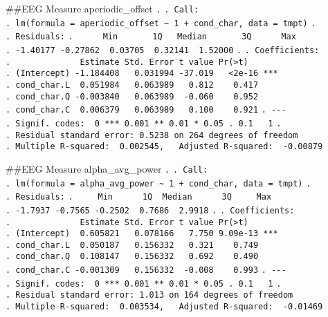 \documentclass[
]{article}
\begin{document}
\#\#EEG Measure aperiodic\_offset \texttt{.} \texttt{.\ Call:}
\texttt{.\ lm(formula\ =\ aperiodic\_offset\ \textasciitilde{}\ 1\ +\ cond\_char,\ data\ =\ tmpt)}
\texttt{.} \texttt{.\ Residuals:}
\texttt{.\ \ \ \ \ \ Min\ \ \ \ \ \ \ 1Q\ \ \ Median\ \ \ \ \ \ \ 3Q\ \ \ \ \ \ Max}
\texttt{.\ -1.40177\ -0.27862\ \ 0.03705\ \ 0.32141\ \ 1.52000}
\texttt{.} \texttt{.\ Coefficients:}
\texttt{.\ \ \ \ \ \ \ \ \ \ \ \ \ \ Estimate\ Std.\ Error\ t\ value\ Pr(\textgreater{}\textbar{}t\textbar{})}
\texttt{.\ (Intercept)\ -1.184408\ \ \ 0.031994\ -37.019\ \ \ \textless{}2e-16\ ***}
\texttt{.\ cond\_char.L\ \ 0.051984\ \ \ 0.063989\ \ \ 0.812\ \ \ \ 0.417}
\texttt{.\ cond\_char.Q\ -0.003840\ \ \ 0.063989\ \ -0.060\ \ \ \ 0.952}
\texttt{.\ cond\_char.C\ \ 0.006379\ \ \ 0.063989\ \ \ 0.100\ \ \ \ 0.921}
\texttt{.\ -\/-\/-}
\texttt{.\ Signif.\ codes:\ \ 0\ \textquotesingle{}***\textquotesingle{}\ 0.001\ \textquotesingle{}**\textquotesingle{}\ 0.01\ \textquotesingle{}*\textquotesingle{}\ 0.05\ \textquotesingle{}.\textquotesingle{}\ 0.1\ \textquotesingle{}\ \textquotesingle{}\ 1}
\texttt{.}
\texttt{.\ Residual\ standard\ error:\ 0.5238\ on\ 264\ degrees\ of\ freedom}
\texttt{.\ Multiple\ R-squared:\ \ 0.002545,\ \ \ Adjusted\ R-squared:\ \ -0.00879}

\#\#EEG Measure alpha\_avg\_power \texttt{.} \texttt{.\ Call:}
\texttt{.\ lm(formula\ =\ alpha\_avg\_power\ \textasciitilde{}\ 1\ +\ cond\_char,\ data\ =\ tmpt)}
\texttt{.} \texttt{.\ Residuals:}
\texttt{.\ \ \ \ \ Min\ \ \ \ \ \ 1Q\ \ Median\ \ \ \ \ \ 3Q\ \ \ \ \ Max}
\texttt{.\ -1.7937\ -0.7565\ -0.2502\ \ 0.7686\ \ 2.9918} \texttt{.}
\texttt{.\ Coefficients:}
\texttt{.\ \ \ \ \ \ \ \ \ \ \ \ \ \ Estimate\ Std.\ Error\ t\ value\ Pr(\textgreater{}\textbar{}t\textbar{})}
\texttt{.\ (Intercept)\ \ 0.605821\ \ \ 0.078166\ \ \ 7.750\ 9.09e-13\ ***}
\texttt{.\ cond\_char.L\ \ 0.050187\ \ \ 0.156332\ \ \ 0.321\ \ \ \ 0.749}
\texttt{.\ cond\_char.Q\ \ 0.108147\ \ \ 0.156332\ \ \ 0.692\ \ \ \ 0.490}
\texttt{.\ cond\_char.C\ -0.001309\ \ \ 0.156332\ \ -0.008\ \ \ \ 0.993}
\texttt{.\ -\/-\/-}
\texttt{.\ Signif.\ codes:\ \ 0\ \textquotesingle{}***\textquotesingle{}\ 0.001\ \textquotesingle{}**\textquotesingle{}\ 0.01\ \textquotesingle{}*\textquotesingle{}\ 0.05\ \textquotesingle{}.\textquotesingle{}\ 0.1\ \textquotesingle{}\ \textquotesingle{}\ 1}
\texttt{.}
\texttt{.\ Residual\ standard\ error:\ 1.013\ on\ 164\ degrees\ of\ freedom}
\texttt{.\ Multiple\ R-squared:\ \ 0.003534,\ \ \ Adjusted\ R-squared:\ \ -0.01469}
\end{document}
